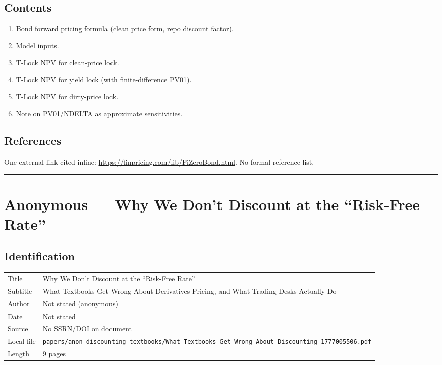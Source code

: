 \documentclass[11pt,a4paper]{article}
\begin{document}
\subsection*{Contents}
\begin{enumerate}[noitemsep]
  \item Bond forward pricing formula (clean price form, repo discount factor).
  \item Model inputs.
  \item T-Lock NPV for clean-price lock.
  \item T-Lock NPV for yield lock (with finite-difference PV01).
  \item T-Lock NPV for dirty-price lock.
  \item Note on PV01/NDELTA as approximate sensitivities.
\end{enumerate}

\subsection*{References}
One external link cited inline: \url{https://finpricing.com/lib/FiZeroBond.html}. No formal reference list.

\bigskip\hrule\bigskip

\section{Anonymous --- Why We Don't Discount at the ``Risk-Free Rate''}
\label{bib:anon-discounting}

\subsection*{Identification}
\begin{tabular}{@{}p{3.5cm}p{11cm}@{}}
\toprule
Title           & Why We Don't Discount at the ``Risk-Free Rate'' \\
Subtitle        & What Textbooks Get Wrong About Derivatives Pricing, and What Trading Desks Actually Do \\
Author          & Not stated (anonymous) \\
Date            & Not stated \\
Source          & No SSRN/DOI on document \\
Local file      & \texttt{papers/anon\_discounting\_textbooks/What\_Textbooks\_Get\_Wrong\_About\_Discounting\_1777005506.pdf} \\
Length          & 9 pages \\
\bottomrule
\end{tabular}
\end{document}
